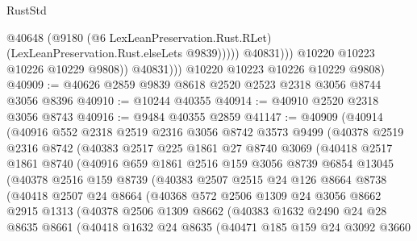 \begin{lexlean}{RustStd}
\begin{coremodule}
                            @40648
                            (@9180
                              (@6 LexLeanPreservation.Rust.RLet)
                              (LexLeanPreservation.Rust.elseLets @9839)))))
                      @40831)))
                @10220
                @10223
                @10226
                @10229
                @9808))
            @40831)))
      @10220
      @10223
      @10226
      @10229
      @9808)
@40909 := @40626 @2859 @9839 @8618 @2520 @2523 @2318 @3056 @8744 @3056 @8396
@40910 := @10244 @40355
@40914 := @40910 @2520 @2318 @3056 @8743
@40916 := @9484 @40355 @2859
@41147 := @40909
    (@40914
      (@40916
        @552
        @2318
        @2519
        @2316
        @3056
        @8742
        @3573
        @9499
        (@40378
          @2519
          @2316
          @8742
          (@40383
            @2517
            @225
            @1861
            @27
            @8740
            @3069
            (@40418
              @2517
              @1861
              @8740
              (@40916
                @659
                @1861
                @2516
                @159
                @3056
                @8739
                @6854
                @13045
                (@40378
                  @2516
                  @159
                  @8739
                  (@40383
                    @2507
                    @2515
                    @24
                    @126
                    @8664
                    @8738
                    (@40418
                      @2507
                      @24
                      @8664
                      (@40368
                        @572
                        @2506
                        @1309
                        @24
                        @3056
                        @8662
                        @2915
                        @1313
                        (@40378
                          @2506
                          @1309
                          @8662
                          (@40383
                            @1632
                            @2490
                            @24
                            @28
                            @8635
                            @8661
                            (@40418
                              @1632
                              @24
                              @8635
                              (@40471
                                @185
                                @159
                                @24
                                @3092
                                @3660

\end{coremodule}
\end{lexlean}
